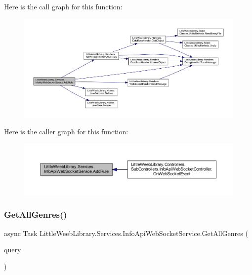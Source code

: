 Here is the call graph for this function\+:\nopagebreak
\begin{figure}[H]
\begin{center}
\leavevmode
\includegraphics[width=350pt]{class_little_weeb_library_1_1_services_1_1_info_api_web_socket_service_a0ed7b2a1d1fe30b43d06232719570435_cgraph}
\end{center}
\end{figure}
Here is the caller graph for this function\+:\nopagebreak
\begin{figure}[H]
\begin{center}
\leavevmode
\includegraphics[width=350pt]{class_little_weeb_library_1_1_services_1_1_info_api_web_socket_service_a0ed7b2a1d1fe30b43d06232719570435_icgraph}
\end{center}
\end{figure}
\mbox{\label{class_little_weeb_library_1_1_services_1_1_info_api_web_socket_service_a2882975741be27c69b461509d48e2636}} 
\subsubsection{\texorpdfstring{Get\+All\+Genres()}{GetAllGenres()}}
{\footnotesize\ttfamily async Task Little\+Weeb\+Library.\+Services.\+Info\+Api\+Web\+Socket\+Service.\+Get\+All\+Genres (\begin{DoxyParamCaption}\item[{J\+Object}]{query }\end{DoxyParamCaption})}



